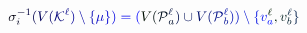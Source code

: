 \documentclass[12pt]{article}
\begin{document}
\makeatletter
\renewcommand*{\@textcolor}[3]{%
  \protect\leavevmode
  \begingroup
    \color#1{#2}#3%
  \endgroup
}
\makeatother
\begin{displaymath}
\mathcolor[RGB]{0,0,15}{\sigma} _ { \mathcolor[RGB]{0,0,30}{i} } ^ { \mathcolor[RGB]{0,0,45}{-} \mathcolor[RGB]{0,0,60}{1} } \mathcolor[RGB]{0,0,75}{(} \mathcolor[RGB]{0,0,90}{V} \mathcolor[RGB]{0,0,105}{(} \mathcal { \mathcolor[RGB]{0,0,120}{K} } ^ { \mathcolor[RGB]{0,0,135}{\ell} } \mathcolor[RGB]{0,0,150}{)} \mathcolor[RGB]{0,0,165}{\setminus} \mathcolor[RGB]{0,0,180}{\{} \mathcolor[RGB]{0,0,195}{\mu} \mathcolor[RGB]{0,0,210}{\}} \mathcolor[RGB]{0,0,225}{)} \mathcolor[RGB]{0,0,240}{=} \mathcolor[RGB]{0,0,255}{(} \mathcolor[RGB]{0,15,0}{V} \mathcolor[RGB]{0,15,15}{(} \mathcal { \mathcolor[RGB]{0,15,30}{P} } _ { \mathcolor[RGB]{0,15,45}{a} } ^ { \mathcolor[RGB]{0,15,60}{\ell} } \mathcolor[RGB]{0,15,75}{)} \mathcolor[RGB]{0,15,90}{\cup} \mathcolor[RGB]{0,15,105}{V} \mathcolor[RGB]{0,15,120}{(} \mathcal { \mathcolor[RGB]{0,15,135}{P} } _ { \mathcolor[RGB]{0,15,150}{b} } ^ { \mathcolor[RGB]{0,15,165}{\ell} } \mathcolor[RGB]{0,15,180}{)} \mathcolor[RGB]{0,15,195}{)} \mathcolor[RGB]{0,15,210}{\setminus} \mathcolor[RGB]{0,15,225}{\{} \mathcolor[RGB]{0,15,240}{v} _ { \mathcolor[RGB]{0,15,255}{a} } ^ { \mathcolor[RGB]{0,30,0}{\ell} } \mathcolor[RGB]{0,30,15}{,} \mathcolor[RGB]{0,30,30}{v} _ { \mathcolor[RGB]{0,30,45}{b} } ^ { \mathcolor[RGB]{0,30,60}{\ell} } \mathcolor[RGB]{0,30,75}{\}}
\end{displaymath}
\end{document}
